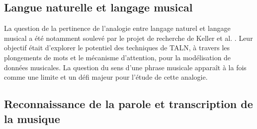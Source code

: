 \subsection{Langue naturelle et langage musical}
La question de la pertinence de l’analogie entre langage naturel et langage musical a été notamment soulevé par le projet de recherche de Keller et al. \cite{keller:hal-03279850}. Leur objectif était d’explorer le potentiel des techniques de TALN, à travers les plongements de mots et le mécanisme d’attention, pour la modélisation de données musicales. La question du sens d’une phrase musicale apparaît à la fois comme une limite et un défi majeur pour l’étude de cette analogie.\\

\subsection{Reconnaissance de la parole et transcription de la musique}
